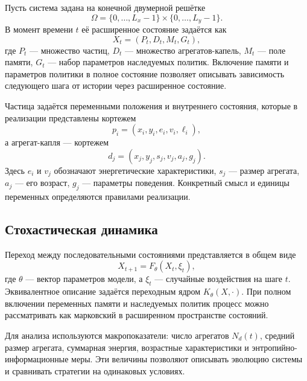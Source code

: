 \documentclass{misisarticle}
\begin{document}
Пусть система задана на конечной двумерной решётке
\begin{equation}
  \Omega=\{0,\ldots,L_x-1\}\times\{0,\ldots,L_y-1\}.
  \label{eq:lattice}
\end{equation}
В момент времени $t$ её расширенное состояние задаётся как
\begin{equation}
  X_t=(P_t,D_t,M_t,G_t),
  \label{eq:state}
\end{equation}
где $P_t$ — множество частиц, $D_t$ — множество агрегатов-капель, $M_t$ — поле памяти, $G_t$ — набор параметров наследуемых политик. Включение памяти и параметров политики в полное состояние позволяет описывать зависимость следующего шага от истории через расширенное состояние.

Частица задаётся переменными положения и внутреннего состояния, которые в реализации представлены кортежем
\begin{equation}
  p_i=(x_i,y_i,e_i,v_i,\ell_i),
  \label{eq:particle}
\end{equation}
а агрегат-капля — кортежем
\begin{equation}
  d_j=(x_j,y_j,s_j,v_j,a_j,g_j).
  \label{eq:droplet}
\end{equation}
Здесь $e_i$ и $v_j$ обозначают энергетические характеристики, $s_j$ — размер агрегата, $a_j$ — его возраст, $g_j$ — параметры поведения. Конкретный смысл и единицы переменных определяются правилами реализации.

\subsection{Стохастическая динамика}

Переход между последовательными состояниями представляется в общем виде
\begin{equation}
  X_{t+1}=F_\theta(X_t,\xi_t),
  \label{eq:transition}
\end{equation}
где $\theta$ — вектор параметров модели, а $\xi_t$ — случайные воздействия на шаге $t$. Эквивалентное описание задаётся переходным ядром $K_\theta(X,\cdot)$. При полном включении переменных памяти и наследуемых политик процесс можно рассматривать как марковский в расширенном пространстве состояний.

Для анализа используются макропоказатели: число агрегатов $N_d(t)$, средний размер агрегата, суммарная энергия, возрастные характеристики и энтропийно-информационные меры. Эти величины позволяют описывать эволюцию системы и сравнивать стратегии на одинаковых условиях.
\end{document}
